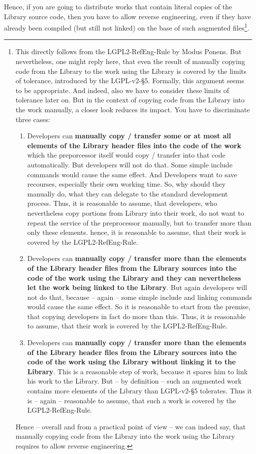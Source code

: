Hence, if you are going to distribute works that contain literal copies of the
Library source code, then you have to allow reverse engineering, even if they
have already been compiled (but still not linked) on the base of such augmented
files\footnote{This directly follows from the LGPL2-RefEng-Rule by Modus Ponens.
But nevertheless, one might reply here, that even the result of manually copying
code from the Library to the work using the Library is covered by the limits of
tolerance, introduced by the LGPL-v2-§5. Formally, this argument seems to be
appropriate. And indeed, also we have to consider these limits of
tolerance later on. But in the context of copying code from the Library into the
work manually, a closer look reduces its impact. You have to discriminate three
cases:
\begin{enumerate}
  \item Developers can  \textbf{manually copy / transfer some or at most all
  elements of the Library header files into the code of the work} which the
  preporcessor itself would copy / transfer into that code automatically. But
  developers will not do that. Some simple include commands would cause the same
  effect. And Developers want to save recourses, especially their own working
  time. So, why should they manually do, what they can delegate to the standard
  development process. Thus, it is reasonable to assume, that developers, who
  nevertheless copy portions from Library into their work, do not want to repeat
  the service of the preprocessor manually, but to transfer more than only these
  elements. hence, it is reasonable to assume, that their work is covered by the
  LGPL2-RefEng-Rule.
  \item Developers can \textbf{manually copy / transfer more than the elements
  of the Library header files from the Library sources into the code of the work
  using the Library and they can nevertheless let the work being linked to the
  Library}. But again developers will not do that, because -- again -- some
  simple include and linking commands would cause the same effect. So it is
  reasonable to start from the premise, that copying developers in fact do more
  than this. Thus, it is reasonable to assume, that their work is covered by the
  LGPL2-RefEng-Rule.
  \item Developers can \textbf{manually copy / transfer more than the elements
  of the Library header files from the Library sources into the code of the work
  using the Library without linking it to the Library}. This is a reasonable
  step of work, because it spares him to link his work to the Library. But -- by
  definition -- such an augmented work contains more elements of the Library
  than LGPL-v2-§5 tolerates. Thus it is -- again -- reasonable to assume, that
  such a work is covered by the LGPL2-RefEng-Rule.
\end{enumerate}
Hence -- overall and from a practical point of view -- we can indeed say, that
manually copying code from the Library into the work using the Library
requires to allow reverse engineering.}.

